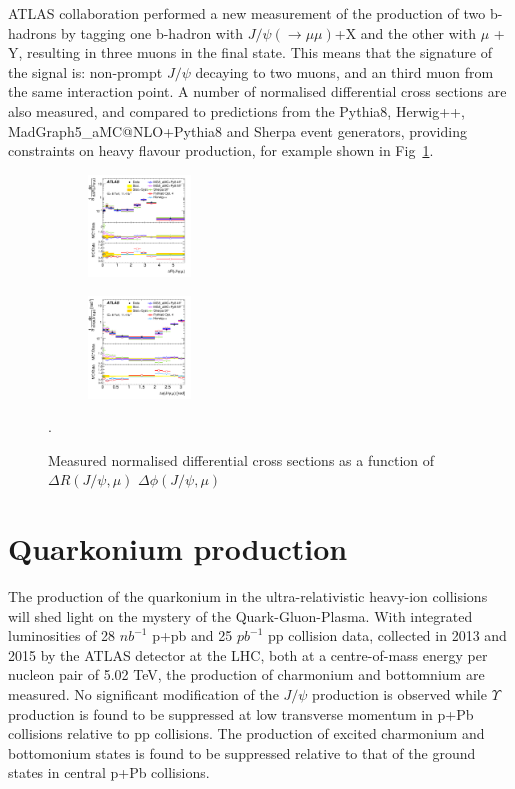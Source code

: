 \documentclass[epj]{webofc}
\begin{document}
ATLAS collaboration performed a new measurement of the production of two b-hadrons by tagging one b-hadron with $J/\psi (\to \mu \mu)$+X and the other with $\mu$ + Y, 
resulting in three muons in the final state. This means that the signature of the signal is: non-prompt $J/\psi$ decaying to two muons, and an third muon from the same
interaction point.
A number of normalised differential cross sections are also measured, and compared to predictions from the Pythia8, Herwig++, MadGraph5\_aMC@NLO+Pythia8 
and Sherpa event generators, providing constraints on heavy flavour production, for example shown in Fig~\ref{fig:bbar}. 

\begin{figure}
    \centering
    \begin{subfigure}[H]{0.45\textwidth}
        \includegraphics[width=0.3\textwidth, natwidth=610,natheight=500]{plots/bbar/fig_07a.png}
    \end{subfigure}
    \begin{subfigure}[H]{0.45\textwidth}
        \includegraphics[width=0.3\textwidth, natwidth=610,natheight=500]{plots/bbar/fig_07b.png}
    \end{subfigure}
    \caption{Measured normalised differential cross sections as a function of $\Delta R (J/\psi, \mu)$ $\Delta \phi (J/\psi, \mu)$}. 
    \label{fig:bbar}
\end{figure}
\section{Quarkonium production} 

The production of the quarkonium in the ultra-relativistic heavy-ion collisions will shed light on the mystery of the Quark-Gluon-Plasma.
With integrated luminosities of 28 $nb^{-1}$ p+pb and 25 $pb^{-1}$ pp collision data, collected in 2013 and 2015 by the ATLAS detector at the LHC, both 
at a centre-of-mass energy per nucleon pair of 5.02 TeV, the production of charmonium and bottomnium are measured. 
No significant modification of the $J/\psi$ production is observed while $\Upsilon$ production is found to be suppressed at low transverse momentum in p+Pb collisions 
relative to pp collisions. The production of excited charmonium and bottomonium states is found to be suppressed relative to that of 
the ground states in central p+Pb collisions.
\end{document}
